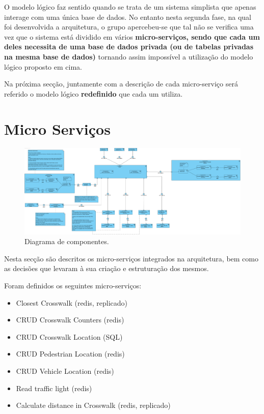 \documentclass[acmsmall,nonacm,screen]{acmart}
\begin{document}
\hspace{5mm} O modelo lógico faz sentido quando se trata de um sistema simplista que apenas interage com uma única base de dados. No entanto nesta segunda fase, na qual foi desenvolvida a arquitetura, o grupo apercebeu-se que tal não se verifica uma vez que o sistema está dividido em vários \textbf{micro-serviços, sendo que cada um deles necessita de uma base de dados privada (ou de tabelas privadas na mesma base de dados)} tornando assim impossível a utilização do modelo lógico proposto em cima.

\hspace{5mm} Na próxima secção, juntamente com a descrição de cada micro-serviço será referido o modelo lógico \textbf{redefinido} que cada um utiliza.

\section{Micro Serviços}

\begin{figure}[H]
    \centering
    \includegraphics[scale=0.19]{images/Arquitetura.png}
    \caption{Diagrama de componentes.}
\end{figure}

\hspace{5mm} Nesta secção são descritos os micro-serviços integrados na arquitetura, bem como as decisões que levaram à sua criação e estruturação dos mesmos. 

\hspace{5mm} Foram definidos os seguintes micro-serviços:
\newline

\begin{itemize}
    \item Closest Crosswalk (redis, replicado)
    \item CRUD Crosswalk Counters (redis)
    \item CRUD Crosswalk Location (SQL)
    \item CRUD Pedestrian Location (redis)
    \item CRUD Vehicle Location (redis)
    \item Read traffic light (redis)
    \item Calculate distance in Crosswalk (redis, replicado)
\end{itemize}
\end{document}
